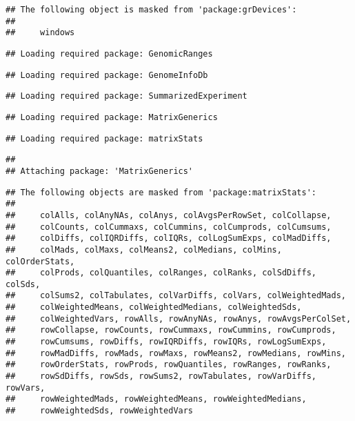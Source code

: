 \documentclass[
]{article}
\begin{document}
\begin{verbatim}
## The following object is masked from 'package:grDevices':
## 
##     windows
\end{verbatim}

\begin{verbatim}
## Loading required package: GenomicRanges
\end{verbatim}

\begin{verbatim}
## Loading required package: GenomeInfoDb
\end{verbatim}

\begin{verbatim}
## Loading required package: SummarizedExperiment
\end{verbatim}

\begin{verbatim}
## Loading required package: MatrixGenerics
\end{verbatim}

\begin{verbatim}
## Loading required package: matrixStats
\end{verbatim}

\begin{verbatim}
## 
## Attaching package: 'MatrixGenerics'
\end{verbatim}

\begin{verbatim}
## The following objects are masked from 'package:matrixStats':
## 
##     colAlls, colAnyNAs, colAnys, colAvgsPerRowSet, colCollapse,
##     colCounts, colCummaxs, colCummins, colCumprods, colCumsums,
##     colDiffs, colIQRDiffs, colIQRs, colLogSumExps, colMadDiffs,
##     colMads, colMaxs, colMeans2, colMedians, colMins, colOrderStats,
##     colProds, colQuantiles, colRanges, colRanks, colSdDiffs, colSds,
##     colSums2, colTabulates, colVarDiffs, colVars, colWeightedMads,
##     colWeightedMeans, colWeightedMedians, colWeightedSds,
##     colWeightedVars, rowAlls, rowAnyNAs, rowAnys, rowAvgsPerColSet,
##     rowCollapse, rowCounts, rowCummaxs, rowCummins, rowCumprods,
##     rowCumsums, rowDiffs, rowIQRDiffs, rowIQRs, rowLogSumExps,
##     rowMadDiffs, rowMads, rowMaxs, rowMeans2, rowMedians, rowMins,
##     rowOrderStats, rowProds, rowQuantiles, rowRanges, rowRanks,
##     rowSdDiffs, rowSds, rowSums2, rowTabulates, rowVarDiffs, rowVars,
##     rowWeightedMads, rowWeightedMeans, rowWeightedMedians,
##     rowWeightedSds, rowWeightedVars
\end{verbatim}
\end{document}
